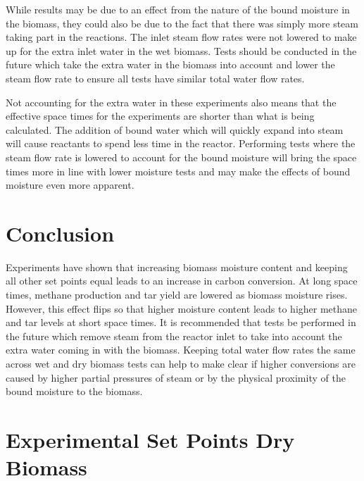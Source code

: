 \documentclass[11pt,twocolumn]{article}
\begin{document}
While results may be due to an effect from the nature of the bound moisture in the biomass, they could also be due to the fact that there was simply more steam taking part in the reactions.  The inlet steam flow rates were not lowered to make up for the extra inlet water in the wet biomass.  Tests should be conducted in the future which take the extra water in the biomass into account and lower the steam flow rate to ensure all tests have similar total water flow rates.

\balance

Not accounting for the extra water in these experiments also means that the effective space times for the experiments are shorter than what is being calculated.  The addition of bound water which will quickly expand into steam will cause reactants to spend less time in the reactor.  Performing tests where the steam flow rate is lowered to account for the bound moisture will bring the space times more in line with lower moisture tests and may make the effects of bound moisture even more apparent.  

\section*{Conclusion}

Experiments have shown that increasing biomass moisture content and keeping all other set points equal leads to an increase in carbon conversion.  At long space times, methane production and tar yield are lowered as biomass moisture rises.  However, this effect flips so that higher moisture content leads to higher methane and tar levels at short space times.  It is recommended that tests be performed in the future which remove steam from the reactor inlet to take into account the extra water coming in with the biomass.  Keeping total water flow rates the same across wet and dry biomass tests can help to make clear if higher conversions are caused by higher partial pressures of steam or by the physical proximity of the bound moisture to the biomass.   


\newpage
\appendix
\onecolumn

\section{Experimental Set Points Dry Biomass}
\label{app_dry_sp}
\end{document}
